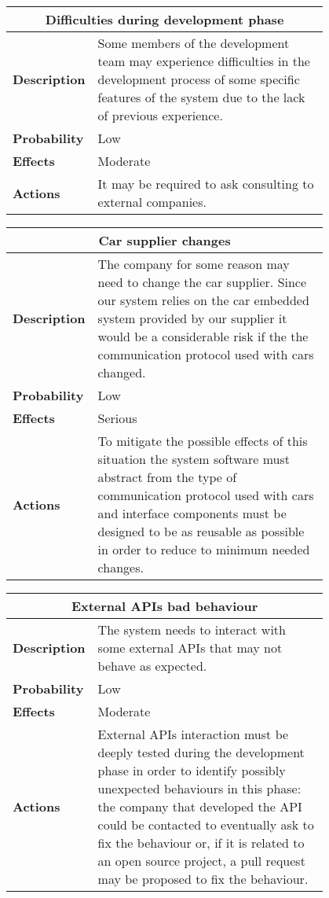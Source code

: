 \begin{longtable}{lp{0.8\linewidth}}
\multicolumn{2}{c}{\textbf{Difficulties during development phase}}\\
\toprule
\textbf{Description}& Some members of the development team may experience difficulties in the development process of some specific features of the system due to the lack of previous experience. \\
\midrule
\textbf{Probability}&Low\\
\midrule
\textbf{Effects}&Moderate\\
\midrule
\textbf{Actions}& It may be required to ask consulting to external companies.\\
\bottomrule
\end{longtable}

\clearpage

\begin{longtable}{lp{0.8\linewidth}}
\multicolumn{2}{c}{\textbf{Car supplier changes}}\\
\toprule
\textbf{Description}& The company for some reason may need to change the car supplier. Since our system relies on the car embedded system provided by our supplier it would be a considerable risk if the the communication protocol used with cars changed. \\
\midrule
\textbf{Probability}&Low\\
\midrule
\textbf{Effects}&Serious\\
\midrule
\textbf{Actions}& To mitigate the possible effects of this situation the system software must abstract from the type of communication protocol used with cars and interface components must be designed to be as reusable as possible in order to reduce to minimum needed changes.\\
\bottomrule
\end{longtable}

\begin{longtable}{lp{0.8\linewidth}}
\multicolumn{2}{c}{\textbf{External APIs bad behaviour}}\\
\toprule
\textbf{Description}& The system needs to interact with some external APIs that may not behave as expected. \\
\midrule
\textbf{Probability}&Low\\
\midrule
\textbf{Effects}&Moderate\\
\midrule
\textbf{Actions}& External APIs interaction must be deeply tested during the development phase in order to identify possibly unexpected behaviours in this phase: the company that developed the API could be contacted to eventually ask to fix the behaviour or, if it is related to an open source project, a pull request may be proposed to fix the behaviour. \\
\bottomrule
\end{longtable}

